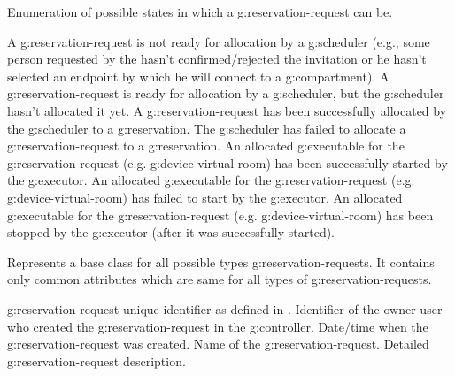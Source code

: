 \begin{Api}
Enumeration of possible states in which a \gls{g:reservation-request} can be.
\begin{ApiEnumValues}
 A \gls{g:reservation-request} is not ready for allocation by a \gls{g:scheduler} (e.g., some person requested by the  hasn't confirmed/rejected the invitation or he hasn't selected an endpoint by which he will connect to a \gls{g:compartment}).
 A \gls{g:reservation-request} is ready for allocation by a \gls{g:scheduler}, but the \gls{g:scheduler} hasn't allocated it yet.
 A \gls{g:reservation-request} has been successfully allocated by the \gls{g:scheduler} to a \gls{g:reservation}.
 The \gls{g:scheduler} has failed to allocate a \gls{g:reservation-request} to a \gls{g:reservation}.
 An allocated \gls{g:executable} for the \gls{g:reservation-request} (e.g. \gls{g:device-virtual-room}) has been successfully started by the \gls{g:executor}.
 An allocated \gls{g:executable} for the \gls{g:reservation-request} (e.g. \gls{g:device-virtual-room}) has failed to start by the \gls{g:executor}.
 An allocated \gls{g:executable} for the \gls{g:reservation-request} (e.g. \gls{g:device-virtual-room}) has been stopped by the \gls{g:executor} (after it was successfully started).
\end{ApiEnumValues}

Represents a base class for all possible types \glspl{g:reservation-request}. It contains only common attributes which are same for all types of \glspl{g:reservation-request}.
\begin{ApiClassAttributes}
 \Gls{g:reservation-request} unique identifier as defined in .
 Identifier of the owner user who created the \gls{g:reservation-request} in the \gls{g:controller}.
 Date/time when the \gls{g:reservation-request} was created.
 Name of the \gls{g:reservation-request}.
 Detailed \gls{g:reservation-request} description.
\end{ApiClassAttributes}


\end{Api}
